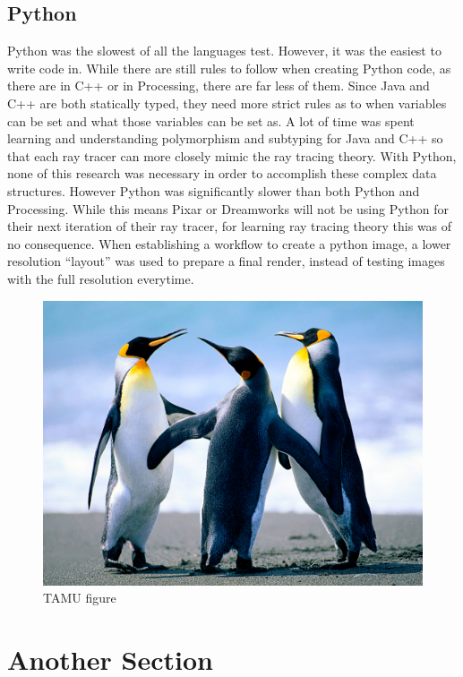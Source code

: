 \subsection{Python}
Python was the slowest of all the languages test.  However, it was the easiest to write code in.  While there are still rules to follow when creating Python code, as there are in C++ or in Processing, there are far less of them.  Since Java and C++ are both statically typed, they need more strict rules as to when variables can be set and what those variables can be set as.  A lot of time was spent learning and understanding polymorphism and subtyping for Java and C++ so that each ray tracer can more closely mimic the ray tracing theory.  With Python, none of this research was necessary in order to accomplish these complex data structures.  However Python was significantly slower than both Python and Processing.  While this means Pixar or Dreamworks will not be using Python for their next iteration of their ray tracer, for learning ray tracing theory this was of no consequence.  When establishing a workflow to create a python image, a lower resolution ``layout'' was used to prepare a final render, instead of testing images with the full resolution everytime.  

\begin{figure}[H]
\centering
\includegraphics[scale=.50]{figures/Penguins.jpg}
\caption{TAMU figure}
\label{fig:tamu-fig3}
\end{figure}
\section{Another Section}

